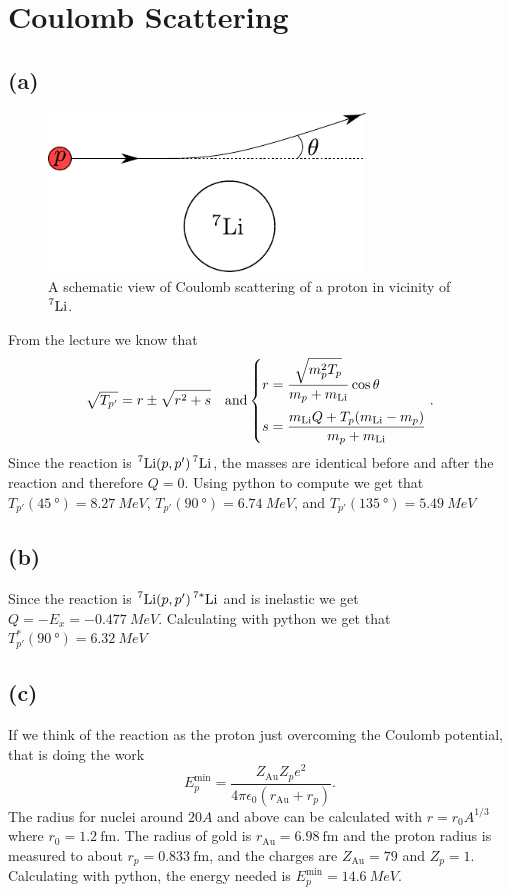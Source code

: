 \section{Coulomb Scattering}
\subsection*{(a)}
\begin{figure}[H]
	\centering
	\includegraphics[width=0.75\textwidth]{figures/coulomb_scattering.pdf}
	\caption{A schematic view of Coulomb scattering of a proton in vicinity of $\nuc{Li}{7}$.}
\end{figure}
From the lecture we know that
\begin{equation}
	\sqrt{T_{p'}} = r \pm \sqrt{r^2 + s} \quad\text{and} \left\{\begin{array}{@{}>{\displaystyle}l@{}}
		r =	\frac{\sqrt{m_p^2 T_p }}{m_p + m_\mathrm{Li}} \cos\theta\\[12pt]
		s = \frac{m_\mathrm{Li} Q + T_p (m_\mathrm{Li} - m_p)}{m_p + m_\mathrm{Li}}
	\end{array}  \right..
\end{equation}
Since the reaction is $\nuc{Li}{7}(p,p')\nuc{Li}{7}$, the masses are identical before and after the reaction and therefore $Q = 0$. Using python to compute we get that $T_{p'}(\SI{45}{\degree}) = \SI{8.27}{MeV}$, $T_{p'}(\SI{90}{\degree}) = \SI{6.74}{MeV}$, and $T_{p'}(\SI{135}{\degree}) = \SI{5.49}{MeV}$

\subsection*{(b)}
Since the reaction is $\nuc{Li}{7}(p,p')\nuc{Li}{7*}$ and is inelastic we get $Q = - E_x = \SI{-0.477}{MeV}$. Calculating with python we get that $T_{p'}^*(\SI{90}{\degree}) = \SI{6.32}{MeV}$

\subsection*{(c)}
If we think of the reaction as the proton just overcoming the Coulomb potential, that is doing the work
\begin{equation}
	E_p^\mathrm{min} = \frac{Z_\mathrm{Au} Z_p e^2}{4 \pi \epsilon_0 (r_\mathrm{Au} + r_p)}.
\end{equation}
The radius for nuclei around $20A$ and above can be calculated with $r=r_0 A^{1/3}$ where $r_0 = \SI{1.2}{\femto\m}$. The radius of gold is $r_\mathrm{Au} = \SI{6.98}{\femto\meter}$ and the proton radius is measured to about $r_p = \SI{0.833}{\femto\m}$, and the charges are $Z_\mathrm{Au} = 79$ and $Z_p = 1$. Calculating with python, the energy needed is $E_p^\mathrm{min} = \SI{14.6}{MeV}$.

